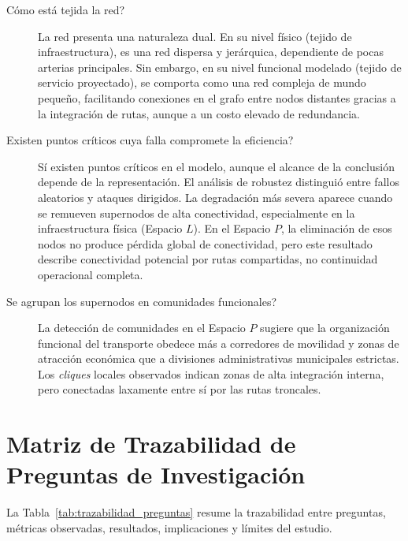 \begin{description}
    \item[\invquestion{}Cómo está tejida la red?]
    La red presenta una naturaleza dual. En su nivel físico (tejido de infraestructura), es una red dispersa y jerárquica, dependiente de pocas arterias principales. Sin embargo, en su nivel funcional modelado (tejido de servicio proyectado), se comporta como una red compleja de mundo pequeño, facilitando conexiones en el grafo entre nodos distantes gracias a la integración de rutas, aunque a un costo elevado de redundancia.

    \item[\invquestion{}Existen puntos críticos cuya falla compromete la eficiencia?]
    Sí existen puntos críticos en el modelo, aunque el alcance de la conclusión depende de la representación. El análisis de robustez distinguió entre fallos aleatorios y ataques dirigidos. La degradación más severa aparece cuando se remueven supernodos de alta conectividad, especialmente en la infraestructura física (Espacio $L$). En el Espacio $P$, la eliminación de esos nodos no produce pérdida global de conectividad, pero este resultado describe conectividad potencial por rutas compartidas, no continuidad operacional completa.

    \item[\invquestion{}Se agrupan los supernodos en comunidades funcionales?]
    La detección de comunidades en el Espacio $P$ sugiere que la organización funcional del transporte obedece más a corredores de movilidad y zonas de atracción económica que a divisiones administrativas municipales estrictas. Los \textit{cliques} locales observados indican zonas de alta integración interna, pero conectadas laxamente entre sí por las rutas troncales.
\end{description}

\section{Matriz de Trazabilidad de Preguntas de Investigación}

La Tabla~\ref{tab:trazabilidad_preguntas} resume la trazabilidad entre preguntas, métricas observadas, resultados, implicaciones y límites del estudio.

